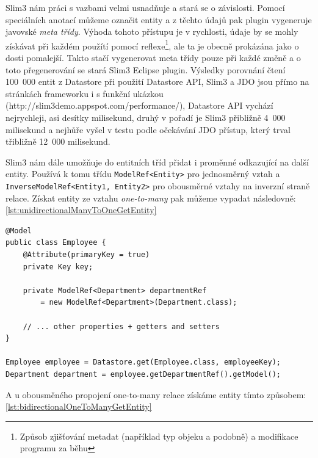 Slim3 nám práci s vazbami velmi usnadňuje a stará se o závislosti. Pomocí speciálních anotací můžeme označit entity a z těchto údajů pak plugin vygeneruje javovské \emph{meta třídy}. Výhoda tohoto přístupu je v rychlosti, údaje by se mohly získávat při každém použítí pomocí reflexe\footnote{Způsob zjišťování metadat (například typ objeku a podobně) a modifikace programu za běhu}, ale ta je obecně  prokázána jako o dosti pomalejší. Takto stačí vygenerovat meta třídy pouze při každé změně a o toto přegenerování se stará Slim3 Eclipse plugin. Výsledky porovnání čtení 100~000 entit z Datastore při použití Datastore API, Slim3 a JDO jsou přímo na stránkách frameworku i s funkční ukázkou (http://slim3demo.appspot.com/performance/), Datastore API vychází nejrychleji, asi desítky milisekund, druhý v pořadí je Slim3 přibližně 4~000 milisekund a nejhůře vyšel v testu podle očekávání JDO přístup, který trval třibližně 12~000 milisekund. 

Slim3 nám dále umožňuje do entitních tříd přidat i proměnné odkazující na další entity. Používá k tomu třídu \verb|ModelRef<Entity>| pro jednosměrný vztah a \verb| InverseModelRef<Entity1, Entity2>| pro obousměrné vztahy na inverzní straně relace. Získat entity ze vztahu \emph{one-to-many} pak můžeme vypadat následovně: \ref{lst:unidirectionalManyToOneGetEntity}

\begin{lstlisting}[caption={Získání entity},label=lst:unidirectionalManyToOneGetEntity,belowcaptionskip=0.4cm]
@Model
public class Employee {
	@Attribute(primaryKey = true)
	private Key key;
	
	private ModelRef<Department> departmentRef 
		= new ModelRef<Department>(Department.class);
	
	// ... other properties + getters and setters
}

Employee employee = Datastore.get(Employee.class, employeeKey);
Department department = employee.getDepartmentRef().getModel();
\end{lstlisting}

A u obousměného propojení one-to-many relace získáme entity tímto způsobem: \ref{lst:bidirectionalOneToManyGetEntity}

